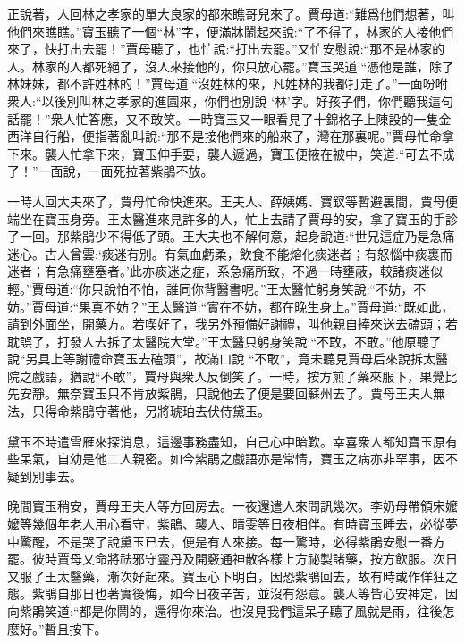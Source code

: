 \begin{parag}
    正說著，人回林之孝家的單大良家的都來瞧哥兒來了。賈母道:“難爲他們想著，叫他們來瞧瞧。”寶玉聽了一個“林”字，便滿牀鬧起來說:“了不得了，林家的人接他們來了，快打出去罷！”賈母聽了，也忙說:“打出去罷。”又忙安慰說:“那不是林家的人。林家的人都死絕了，沒人來接他的，你只放心罷。”寶玉哭道:“憑他是誰，除了林妹妹，都不許姓林的！”賈母道:“沒姓林的來，凡姓林的我都打走了。”一面吩咐衆人:“以後別叫林之孝家的進園來，你們也別說 ‘林’字。好孩子們，你們聽我這句話罷！”衆人忙答應，又不敢笑。一時寶玉又一眼看見了十錦格子上陳設的一隻金西洋自行船，便指著亂叫說:“那不是接他們來的船來了，灣在那裏呢。”賈母忙命拿下來。襲人忙拿下來，寶玉伸手要，襲人遞過，寶玉便掖在被中，笑道:“可去不成了！”一面說，一面死拉著紫鵑不放。
\end{parag}


\begin{parag}
    一時人回大夫來了，賈母忙命快進來。王夫人、薛姨媽、寶釵等暫避裏間，賈母便端坐在寶玉身旁。王太醫進來見許多的人，忙上去請了賈母的安，拿了寶玉的手診了一回。那紫鵑少不得低了頭。王大夫也不解何意，起身說道:“世兄這症乃是急痛迷心。古人曾雲:‘痰迷有別。有氣血虧柔，飲食不能熔化痰迷者；有怒惱中痰裹而迷者；有急痛壅塞者。’此亦痰迷之症，系急痛所致，不過一時壅蔽，較諸痰迷似輕。”賈母道:“你只說怕不怕，誰同你背醫書呢。”王太醫忙躬身笑說:“不妨，不妨。”賈母道:“果真不妨？”王太醫道:“實在不妨，都在晚生身上。”賈母道:“既如此，請到外面坐，開藥方。若喫好了，我另外預備好謝禮，叫他親自捧來送去磕頭；若耽誤了，打發人去拆了太醫院大堂。”王太醫只躬身笑說:“不敢，不敢。”他原聽了說“另具上等謝禮命寶玉去磕頭”，故滿口說 “不敢”，竟未聽見賈母后來說拆太醫院之戲語，猶說“不敢”，賈母與衆人反倒笑了。一時，按方煎了藥來服下，果覺比先安靜。無奈寶玉只不肯放紫鵑，只說他去了便是要回蘇州去了。賈母王夫人無法，只得命紫鵑守著他，另將琥珀去伏侍黛玉。
\end{parag}


\begin{parag}
    黛玉不時遣雪雁來探消息，這邊事務盡知，自己心中暗歎。幸喜衆人都知寶玉原有些呆氣，自幼是他二人親密。如今紫鵑之戲語亦是常情，寶玉之病亦非罕事，因不疑到別事去。
\end{parag}


\begin{parag}
    晚間寶玉稍安，賈母王夫人等方回房去。一夜還遣人來問訊幾次。李奶母帶領宋嬤嬤等幾個年老人用心看守，紫鵑、襲人、晴雯等日夜相伴。有時寶玉睡去，必從夢中驚醒，不是哭了說黛玉已去，便是有人來接。每一驚時，必得紫鵑安慰一番方罷。彼時賈母又命將祛邪守靈丹及開竅通神散各樣上方祕製諸藥，按方飲服。次日又服了王太醫藥，漸次好起來。寶玉心下明白，因恐紫鵑回去，故有時或作佯狂之態。紫鵑自那日也著實後悔，如今日夜辛苦，並沒有怨意。襲人等皆心安神定，因向紫鵑笑道:“都是你鬧的，還得你來治。也沒見我們這呆子聽了風就是雨，往後怎麼好。”暫且按下。
\end{parag}


